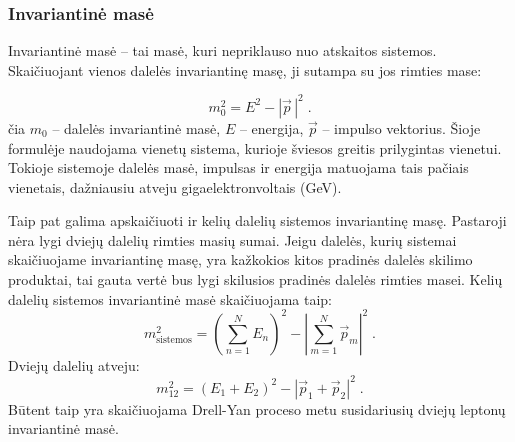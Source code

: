 \documentclass[a4paper, 12pt]{article}
\newlength\q
\begin{document}
\subsubsection*{Invariantinė masė} 

Invariantinė masė -- tai masė, kuri nepriklauso nuo atskaitos sistemos.
Skaičiuojant vienos dalelės invariantinę masę, ji sutampa su jos rimties mase:

\begin{equation}
	m_{0}^{2} = E^{2} - | \vec{p}\, |^{2} \; .
	\label{eq:invm}
\end{equation}
čia $m_{0}$ -- dalelės invariantinė masė, $E$ -- energija, $\vec{p}$ -- impulso vektorius.
Šioje formulėje naudojama vienetų sistema, kurioje šviesos greitis prilygintas vienetui.
Tokioje sistemoje dalelės masė, impulsas ir energija matuojama tais pačiais vienetais, dažniausiu atveju
gigaelektronvoltais (GeV).

Taip pat galima apskaičiuoti ir kelių dalelių sistemos invariantinę masę.
Pastaroji nėra lygi dviejų dalelių rimties masių sumai.
Jeigu dalelės, kurių sistemai skaičiuojame invariantinę masę, yra kažkokios kitos pradinės dalelės
skilimo produktai, tai gauta vertė bus lygi skilusios pradinės dalelės rimties masei.
Kelių dalelių sistemos invariantinė masė skaičiuojama taip:
\begin{equation}
	m_{\mathrm{sistemos}}^{2} = \left( \sum_{n=1}^{N} E_{n} \right)^{2} -
	\left| \sum_{m=1}^{N} \vec{p}_{m} \right|^{2} \; .
	\label{eq:minvm}
\end{equation}
Dviejų dalelių atveju:
\begin{equation}
	m_{12}^2 = ( E_{1} + E_{2} )^{2} - | \vec{p}_{1} + \vec{p}_{2} |^{2} \; .
	\label{eq:tinvm}
\end{equation}
Būtent taip yra skaičiuojama Drell-Yan proceso metu susidariusių dviejų leptonų invariantinė masė.
\end{document}
